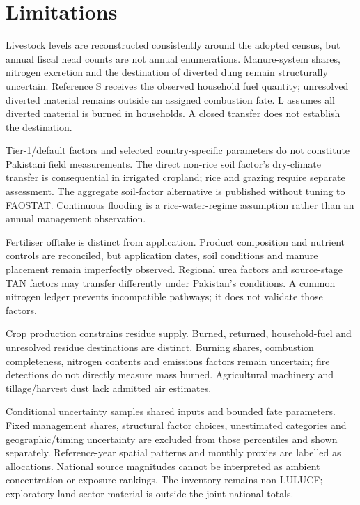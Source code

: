 \section{Limitations}
\label{sec:limitations}
Livestock levels are reconstructed consistently around the adopted census, but annual fiscal head counts are not annual enumerations. Manure-system shares, nitrogen excretion and the destination of diverted dung remain structurally uncertain. Reference S receives the observed household fuel quantity; unresolved diverted material remains outside an assigned combustion fate. L assumes all diverted material is burned in households. A closed transfer does not establish the destination.

Tier-1/default factors and selected country-specific parameters do not constitute Pakistani field measurements. The direct non-rice soil factor's dry-climate transfer is consequential in irrigated cropland; rice and grazing require separate assessment. The aggregate soil-factor alternative is published without tuning to FAOSTAT. Continuous flooding is a rice-water-regime assumption rather than an annual management observation.

Fertiliser offtake is distinct from application. Product composition and nutrient controls are reconciled, but application dates, soil conditions and manure placement remain imperfectly observed. Regional urea factors and source-stage TAN factors may transfer differently under Pakistan's conditions. A common nitrogen ledger prevents incompatible pathways; it does not validate those factors.

Crop production constrains residue supply. Burned, returned, household-fuel and unresolved residue destinations are distinct. Burning shares, combustion completeness, nitrogen contents and emissions factors remain uncertain; fire detections do not directly measure mass burned. Agricultural machinery and tillage/harvest dust lack admitted air estimates.

Conditional uncertainty samples shared inputs and bounded fate parameters. Fixed management shares, structural factor choices, unestimated categories and geographic/timing uncertainty are excluded from those percentiles and shown separately. Reference-year spatial patterns and monthly proxies are labelled as allocations. National source magnitudes cannot be interpreted as ambient concentration or exposure rankings. The inventory remains non-LULUCF; exploratory land-sector material is outside the joint national totals.
